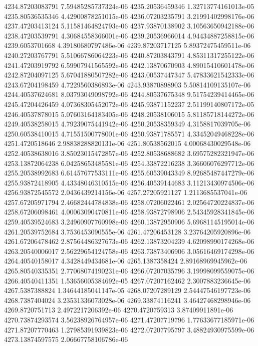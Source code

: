 {4234.87203083791 7.59485285737324e-06
4235.20536459346 1.32713774161013e-05
4235.80536535346 4.42900878251015e-06
4236.07203235791 3.21991402998176e-06
4237.47203413124 5.11581464824793e-06
4237.93870138902 3.10563650942188e-06
4238.47203539791 4.30684558366001e-06
4239.20536966014 4.94434887258815e-06
4239.6053701668 4.39180680797486e-06
4239.87203717125 5.89372475459511e-06
4240.27203767791 5.51066786064223e-06
4240.87203843791 4.85311317255122e-06
4241.47203919792 6.59907941565592e-06
4242.13870670903 4.89015410601478e-06
4242.87204097125 5.67041880507282e-06
4243.00537447347 5.47833621542333e-06
4243.67204198459 4.7229560386893e-06
4243.93870898903 5.50814109135107e-06
4244.40537624681 8.03793049098792e-06
4244.80537675348 9.51754239414465e-06
4245.47204426459 4.07368305452072e-06
4245.93871152237 2.51199140807172e-05
4246.40537878015 5.07603164183405e-06
4248.20538106015 5.81185718144272e-06
4249.40538258015 4.79239075441942e-06
4250.20538359349 4.3158817039705e-06
4250.60538410015 4.71551500778001e-06
4250.93871785571 4.33452049468228e-06
4251.4720518646 2.98838288820131e-06
4251.80538562015 4.00068430029548e-06
4252.40538638016 3.85023015472857e-06
4252.80538688682 3.69575282321947e-06
4253.13872064238 6.04258653485581e-06
4254.33872216238 3.36606076297712e-06
4255.20538992683 6.61457677533111e-06
4255.60539043349 8.92685487447279e-06
4255.93872418905 4.43348046310515e-06
4256.40539144683 3.11213430974506e-06
4256.93872545572 2.0436439214156e-06
4257.27205921127 1.2113685537041e-06
4257.67205971794 2.46682444784838e-06
4258.07206022461 2.02564720224837e-06
4258.67206098461 4.00063090470811e-06
4258.93872798906 2.54345928341845e-06
4259.40539524683 3.24960907760998e-06
4260.13872950906 5.69681145195014e-06
4261.20539752684 3.7536453090555e-06
4261.47206453128 3.23764205920896e-06
4261.67206478462 2.87564486327673e-06
4262.13873204239 4.62098990174268e-06
4263.20540006017 2.56229654124758e-06
4263.73873406906 3.05616469174298e-06
4264.40540158017 4.3428449434681e-06
4265.1387358424 2.89168969945962e-06
4265.80540335351 2.77068074190231e-06
4266.07207035796 3.19998099559075e-06
4266.40540411351 1.53656005384692e-05
4267.07207162462 2.3007883236645e-06
4267.5387388824 1.34644185041147e-05
4268.07207289129 2.54447546197723e-06
4268.7387404024 3.23531336073028e-06
4269.33874116241 3.46427468298946e-06
4269.8720751713 2.4972217206392e-06
4270.4720759313 3.87409911891e-06
4270.73874293574 3.56238926764957e-06
4271.47207719796 1.77633677185971e-06
4271.87207770463 1.27985391939823e-06
4272.07207795797 3.48824930975599e-06
4273.13874597575 2.06667758106786e-06
}
